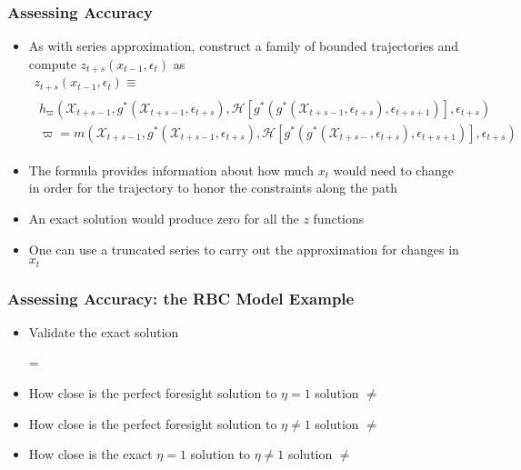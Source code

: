 \documentclass{beamer}
\begin{document}
\begin{frame}
  \frametitle{Assessing Accuracy}
{\small

  \begin{itemize}
  \item As with series approximation,
 construct a family of bounded trajectories and compute
$  z_{t+s}(x_{t-1},\epsilon_t)$ as  %
{
\begin{gather}
  z_{t+s}(x_{t-1},\epsilon_t) \equiv\\
   \begin{split}
 h_{\varpi}(\mathcal{X}_{t+s-1},g^\ast(\mathcal{X}_{t+s-1},\epsilon_{t+s}),\mathcal{H}[g^\ast(g^\ast(\mathcal{X}_{t+s-1},\epsilon_{t+s}),\epsilon_{t+s+1})],\epsilon_{t+s}) \label{theProblem} \\
\varpi= m(\mathcal{X}_{t+s-1},g^\ast(\mathcal{X}_{t+s-1},\epsilon_{t+s}),\mathcal{H}[g^\ast(g^\ast(\mathcal{X}_{t+s-},\epsilon_{t+s}),\epsilon_{t+s+1})],\epsilon_{t+s}) 
   \end{split}
  \end{gather}
}
\item The formula provides information about how much $x_{t}$ would need
to change in order for the trajectory to honor the constraints along the path
\item An exact solution would produce zero for all the $z$ functions
\item One can use a truncated series to carry out the approximation for changes in $x_t$
  \end{itemize}
}
\end{frame}

\begin{frame}
  \frametitle{Assessing Accuracy: the RBC Model Example}
  \begin{itemize}
  \item Validate the exact solution

 =
  \item How close is the perfect foresight solution to $\eta=1$ solution
 $\ne$
  \item How close is the perfect foresight solution to $\eta \ne 1$ solution
 $\ne$
  \item How close is the exact $\eta=1$  solution to $\eta \ne 1$ solution
 $\ne$
  \end{itemize}
\end{frame}
\end{document}
